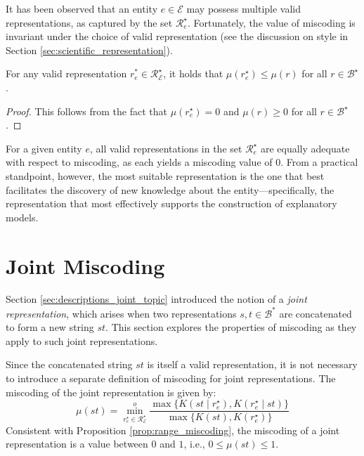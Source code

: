 It has been observed that an entity $e \in \mathcal{E}$ may possess multiple valid representations, as captured by the set $\mathcal{R}^\star_e$. Fortunately, the value of miscoding is invariant under the choice of valid representation (see the discussion on style in Section \ref{sec:scientific_representation}).

\begin{proposition}
For any valid representation $r^\ast_e \in \mathcal{R}^\star_\mathcal{E}$, it holds that $\mu\left( r^\star_e \right) \leq \mu\left( r \right)$ for all $r \in \mathcal{B}^\star$.
\end{proposition}
\begin{proof}
This follows from the fact that $\mu\left( r^\star_e \right) = 0$ and $\mu\left( r \right) \geq 0$ for all $r \in \mathcal{B}^\star$.
\end{proof}

For a given entity $e$, all valid representations in the set $\mathcal{R}^\star_e$ are equally adequate with respect to miscoding, as each yields a miscoding value of $0$. From a practical standpoint, however, the most suitable representation is the one that best facilitates the discovery of new knowledge about the entity—specifically, the representation that most effectively supports the construction of explanatory models.

%
%

\section{Joint Miscoding}
\label{sec:joint_miscoding}

Section \ref{sec:descriptions_joint_topic} introduced the notion of a \emph{joint representation}, which arises when two representations $s, t \in \mathcal{B}^\ast$ are concatenated to form a new string $st$. This section explores the properties of miscoding as they apply to such joint representations.

Since the concatenated string $st$ is itself a valid representation, it is not necessary to introduce a separate
definition of miscoding for joint representations. The miscoding of the joint representation is given by:
\[
\mu(st) = \overset{o}{ \underset{ r^\star_e \in \mathcal{R}^\star_\mathcal{E} } \min} \frac{ \max\{ K \left( st \mid r^\star_e \right), K \left( r^\star_e \mid st \right) \} } { \max\{ K \left( st \right), K \left( r^\star_e \right) \} }
\]
Consistent with Proposition \ref{prop:range_miscoding}, the miscoding of a joint representation is a value between $0$ and $1$, i.e., $0 \leq \mu(st) \leq 1$.

